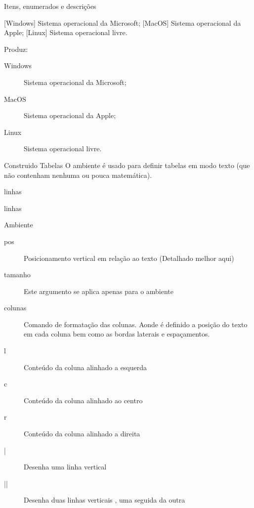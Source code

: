 \begin{frame}{Itens, enumerados e descrições}
\begin{LaTeXcode}
 \n
{} [Windows] Sistema operacional da Microsoft; \n
{} [MacOS] Sistema operacional da Apple; \n
{} [Linux] Sistema operacional livre. \n
{}
\end{LaTeXcode}

Produz:

\begin{LaTeXoutput}
\begin{description}
\item [Windows] Sistema operacional da Microsoft;
\item [MacOS] Sistema operacional da Apple;
\item [Linux] Sistema operacional livre.
\end{description}
\end{LaTeXoutput}
\end{frame}

\begin{frame}{Construido Tabelas}
O ambiente  é usado para definir tabelas em modo texto (que não contenham nenhuma ou pouca matemática).

\begin{LaTeXcode}[Sintaxe]
linhas \\

linhas \\
\end{LaTeXcode}
\end{frame}

\begin{frame}{Ambiente }
\begin{description}
	\item [pos] Posicionamento vertical em relação ao texto (Detalhado melhor aqui)
	\item [tamanho] Este argumento se aplica apenas para o ambiente %
	\item [colunas] Comando de formatação das colunas. Aonde é definido a posição do texto em cada coluna bem como as bordas laterais e espaçamentos.
\end{description}
	\begin{description}
	\item [l] Conteúdo da coluna alinhado a esquerda
	\item [c] Conteúdo da coluna alinhado ao centro
	\item [r] Conteúdo da coluna alinhado a direita
	\item [|] Desenha uma linha vertical
	\item [||] Desenha duas linhas verticais , uma seguida da outra
	\end{description}
\end{frame}


